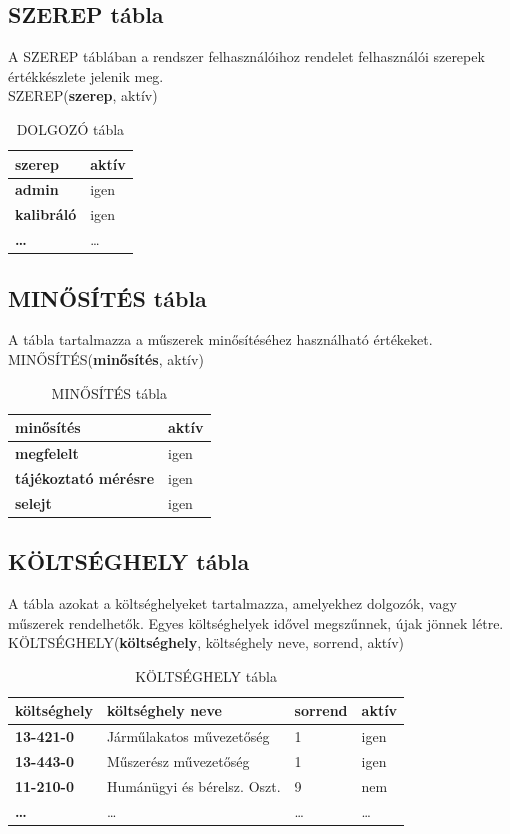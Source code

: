 \documentclass[a4paper,12pt]{report}
\newcommand{\PK}[1]{\textbf{#1}}
\newcommand{\TABLA}[1]{\noindent\MakeUppercase{#1}}
\begin{document}
\subsection{SZEREP tábla}
A \TABLA{szerep} táblában a rendszer felhasználóihoz rendelet felhasználói 
szerepek értékkészlete jelenik meg.\\

\TABLA{SZEREP}(\PK{szerep}, aktív)
\begin{table}[ht!]
\centering
\begin{tabular}[t]{|l|l|}
\hline
 \textbf{szerep}&aktív\\\hline
 \textbf{admin}&igen\\
 \textbf{kalibráló}&igen\\
 \textbf{\dots}&\dots\\
\end{tabular}
\caption{DOLGOZÓ tábla} \label{tabSZEREP}
\end{table}


\subsection{MINŐSÍTÉS tábla}
A tábla tartalmazza a műszerek minősítéséhez használható értékeket.\\

\TABLA{MINŐSÍTÉS}(\PK{minősítés}, aktív)
\begin{table}[ht!]
\centering
\begin{tabular}[t]{|l|l|}
\hline
 \textbf{minősítés}&aktív\\\hline
 \textbf{megfelelt}&igen\\
 \textbf{tájékoztató mérésre}&igen\\
 \textbf{selejt}&igen\\
 \hline
\end{tabular}
\caption{MINŐSÍTÉS tábla} \label{tabMINOSITES}
\end{table}


\subsection{KÖLTSÉGHELY tábla}
A tábla azokat a költséghelyeket tartalmazza, amelyekhez dolgozók, vagy 
műszerek rendelhetők. Egyes költséghelyek idővel megszűnnek, újak jönnek
létre.\\

\TABLA{KÖLTSÉGHELY}(\PK{költséghely}, költséghely neve, sorrend, aktív)
\begin{table}[ht!]
\centering
\begin{tabular}[t]{|l|l|l|l|}
\hline
 \textbf{költséghely}&költséghely neve&sorrend&aktív\\ \hline
 \textbf{13-421-0}&Járműlakatos művezetőség&1&igen\\
 \textbf{13-443-0}&Műszerész művezetőség&1&igen\\
 \textbf{11-210-0}&Humánügyi és bérelsz. Oszt.&9&nem\\
 \textbf{\dots}&\dots&\dots&\dots \\
\end{tabular}
\caption{KÖLTSÉGHELY tábla} \label{tabKOLTSEGHELY}
\end{table}
\end{document}
